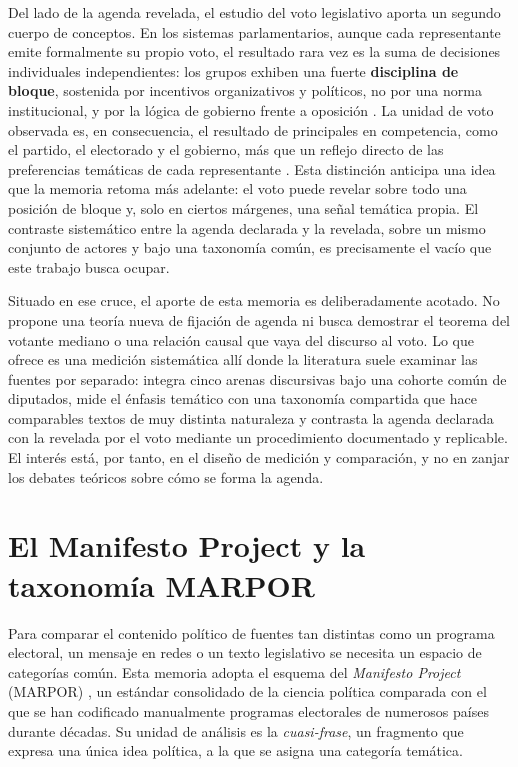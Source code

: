 Del lado de la agenda revelada, el estudio del voto legislativo aporta un segundo
cuerpo de conceptos. En los sistemas parlamentarios, aunque cada representante
emite formalmente su propio voto, el resultado rara vez es la suma de decisiones
individuales independientes: los grupos exhiben una fuerte \textbf{disciplina de
bloque}, sostenida por incentivos organizativos y políticos, no por una norma
institucional, y por la lógica de gobierno frente a oposición
\cite{sieberer2006partyunity}. La unidad de
voto observada es, en consecuencia, el resultado de principales en competencia,
como el partido, el electorado y el gobierno, más que un reflejo directo de las
preferencias temáticas de cada representante \cite{carey2007competing}. Esta
distinción anticipa una idea que la memoria retoma más adelante: el voto puede
revelar sobre todo una posición de bloque y, solo en ciertos márgenes, una señal
temática propia. El contraste sistemático entre la agenda declarada y la revelada,
sobre un mismo conjunto de actores y bajo una taxonomía común, es precisamente el
vacío que este trabajo busca ocupar.

Situado en ese cruce, el aporte de esta memoria es deliberadamente acotado. No
propone una teoría nueva de fijación de agenda ni busca demostrar el teorema del
votante mediano o una relación causal que vaya del discurso al voto. Lo que ofrece
es una medición sistemática allí donde la literatura suele examinar las fuentes
por separado: integra cinco arenas discursivas bajo una cohorte común de
diputados, mide el énfasis temático con una taxonomía compartida que hace
comparables textos de muy distinta naturaleza y contrasta la agenda declarada con
la revelada por el voto mediante un procedimiento documentado y replicable. El
interés está, por tanto, en el diseño de medición y comparación, y no en zanjar
los debates teóricos sobre cómo se forma la agenda.

\section{El Manifesto Project y la taxonomía MARPOR}
\label{sec:marpor}

Para comparar el contenido político de fuentes tan distintas como un programa
electoral, un mensaje en redes o un texto legislativo se necesita un espacio de
categorías común. Esta memoria adopta el esquema del \emph{Manifesto Project}
(MARPOR) \cite{marpor_mp_v5}, un estándar consolidado de la ciencia política
comparada con el que se han codificado manualmente programas electorales de
numerosos países durante décadas. Su unidad de análisis es la \emph{cuasi-frase},
un fragmento que expresa una única idea política, a la que se asigna una
categoría temática.


